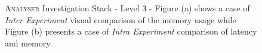 \begin{figure}[tbh]
  \centering
\caption[\textsc{Analyser} Investigation Stack - Level 3 - Visual Comparison Examples]{\textsc{Analyser} Investigation Stack - Level 3 - Figure (a) shows a case of \textit{Inter Experiment} visual comparison of the memory usage while Figure (b) presents a case of \textit{Intra Experiment} comparison of latency and memory.}
  \label{fig:visual-comp}
\end{figure}